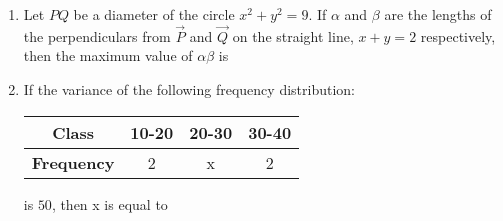 \documentclass[journal]{IEEEtran}
\begin{document}
\begin{enumerate}[start=16]
\item Let $PQ$ be a diameter of the circle $x^2+y^2=9$. If $\alpha$ and $\beta$ are the lengths of the perpendiculars from $\vec{P}$ and $\vec{Q}$ on the straight line, $x+y=2$ respectively, then the maximum value of $\alpha\beta$ is \underline{\hspace{1cm}}\\

\item If the variance of the following frequency distribution:

\begin{center}
\begin{tabular}{|c|c|c|c|}
\hline
\textbf{Class}     & 10-20 & 20-30 & 30-40 \\
\hline
\textbf{Frequency} & 2     & x     & 2     \\
\hline
\end{tabular}
\end{center}

is $50$, then  x is equal to \underline{\hspace{1cm}}



\end{enumerate}
\end{document}
